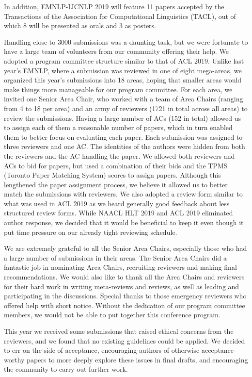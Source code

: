 In addition, EMNLP-IJCNLP 2019 will feature 11 papers accepted by the Transactions of the Association for Computational Linguistics (TACL), out of which 8 will be presented as orals and 3 as posters.		
 
Handling close to 3000 submissions was a daunting task, but we were fortunate to have a large team of volunteers from our community offering their help. We adopted a program committee structure similar to that of ACL 2019. Unlike last year’s EMNLP, where a submission was reviewed in one of eight mega-areas, we organized this year’s submissions into 18 areas, hoping that smaller areas would make things more manageable for our program committee. For each area, we invited one Senior Area Chair, who worked with a team of Area Chairs (ranging from 4 to 18 per area) and an army of reviewers (1721 in total across all areas) to review the submissions. Having a large number of ACs (152 in total) allowed us to assign each of them a reasonable number of papers, which in turn enabled them to better focus on evaluating each paper. Each submission was assigned to three reviewers and one AC. The identities of the authors were hidden from both the reviewers and the AC handling the paper. We allowed both reviewers and ACs to bid for papers, but used a combination of their bids and the TPMS (Toronto Paper Matching System) scores to assign papers. Although this lengthened the paper assignment process, we believe it allowed us to better match the submissions with reviewers. We also adopted a review form similar to what was used in ACL 2019 as we heard generally good feedback about less structured review forms. While NAACL HLT 2019 and ACL 2019 eliminated author response, we decided that it would be beneficial to keep it even though it put time pressure on our already tight reviewing schedule.

We are extremely grateful to all the Senior Area Chairs, especially those who had a large number of submissions in their areas. The Senior Area Chairs did a fantastic job in nominating Area Chairs, recruiting reviewers and making final recommendations. We would also like to thank all the Area Chairs and reviewers for their hard work in writing meta-reviews and reviews, as well as leading and participating in the discussions. Special thanks to those emergency reviewers who offered help with short notice. Without the dedication of our program committee members, we would not be able to put together this conference program.

This year we received some submissions that raised ethical concerns from the reviewers, and we found that no existing guidelines could be applied. We decided to err on the side of acceptance, encouraging authors of otherwise acceptance-worthy papers to more deeply explore these issues in final drafts, and encouraging the community to carry out further work.

